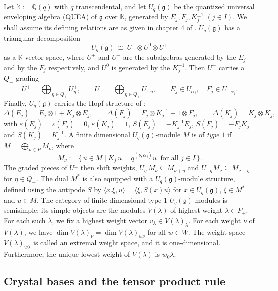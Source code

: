 \documentclass[12pt]{amsart}
\theoremstyle{plain}
\theoremstyle{remark}
\newcommand{\g}{\mathfrak{g}}
\newcommand{\Uq}{U_q(\g)}
\newcommand{\ot}{\otimes}
\newcommand{\Qp}{Q_{+}}
\newcommand{\K}{\mathbb{K}}
\begin{document}
Let $\K:=\mathbb Q(q)$ with $q$ transcendental, and let $\Uq$ be the quantized universal enveloping algebra (QUEA) of $\g$
over $\K$, generated by $E_j,F_j,K_j^{\pm1}$ $(j\in I)$. We shall assume its defining
relations are as given in chapter 4 of \cite{Jantzen}. $\Uq$ has a triangular
decomposition
\[
\Uq\ \cong\ U^-\ot U^0\ot U^+
\]
as a $\K$-vector space, where $U^+$ and $U^-$ are the subalgebras generated by the
$E_j$ and by the $F_j$ respectively, and $U^0$ is generated by the $K_j^{\pm1}$. Then
$U^\pm$ carries a $\Qp$-grading
\[
U^+=\bigoplus_{\eta\in\Qp}U^+_\eta,\qquad U^-=\bigoplus_{\eta\in\Qp}U^-_{-\eta},
\qquad E_j\in U^+_{\alpha_j},\quad F_j\in U^-_{-\alpha_j}.
\]
Finally, $\Uq$ carries the Hopf structure of \cite[Ch.~4]{Jantzen}:
\begin{equation}\label{eq:hopf}
\Delta(E_j)=E_j\ot1+K_j\ot E_j,\qquad
\Delta(F_j)=F_j\ot K_j^{-1}+1\ot F_j,\qquad
\Delta(K_j)=K_j\ot K_j,
\end{equation}
with $\varepsilon(E_j)=\varepsilon(F_j)=0$, $\varepsilon(K_j)=1$,
$S(E_j)=-K_j^{-1}E_j$, $S(F_j)=-F_jK_j$ and $S(K_j)=K_j^{-1}$. A finite dimensional $\Uq$-module $M$ is of \emph{type $1$} if $M=\bigoplus_{\nu\in P}M_\nu$, where
\[
M_\nu:=\{\,u\in M\mid K_j\,u=q^{(\nu,\alpha_j)}u\ \text{ for all }j\in I\,\}.
\]
The graded pieces of $U^\pm$ then shift weights, $U^+_\eta M_\nu\subseteq M_{\nu+\eta}$
and $U^-_{-\eta}M_\nu\subseteq M_{\nu-\eta}$ for $\eta\in\Qp$. The dual $M^*$ is also equipped with a $\Uq$-module structure, defined using the antipode $S$
by $\langle x.\xi,u\rangle=\langle\xi,S(x)u\rangle$ for $x\in\Uq$, $\xi\in M^*$ and
$u\in M$. The category of finite-dimensional type-$1$
$\Uq$-modules is semisimple; its simple objects are the modules $V(\lambda)$ of highest
weight $\lambda\in P_+$. For each such $\lambda$, we fix a highest
weight vector $v_\lambda\in V(\lambda)_\lambda$. For each weight $\nu$ of $V(\lambda)$, we have
$\dim V(\lambda)_\nu=\dim V(\lambda)_{w\nu}$ for all $w\in W$. The weight space $V(\lambda)_{w\lambda}$ is called an extremal weight
space, and it is one-dimensional. Furthermore, the unique lowest weight of $V(\lambda)$ is
$w_0\lambda$.

\subsection{Crystal bases and the tensor product rule}\label{ss:crystal}
\end{document}
